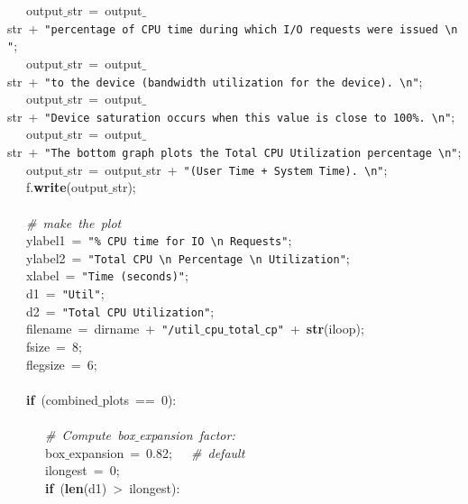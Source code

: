 \mbox{}\ \ \ output$\_$str\ =\ output$\_$str\ +\ \texttt{"{}percentage\ of\ CPU\ time\ during\ which\ I/O\ requests\ were\ issued\ \textbackslash{}n"{}}; \\
\mbox{}\ \ \ output$\_$str\ =\ output$\_$str\ +\ \texttt{"{}to\ the\ device\ (bandwidth\ utilization\ for\ the\ device).\ \textbackslash{}n"{}}; \\
\mbox{}\ \ \ output$\_$str\ =\ output$\_$str\ +\ \texttt{"{}Device\ saturation\ occurs\ when\ this\ value\ is\ close\ to\ 100\%.\ \textbackslash{}n"{}}; \\
\mbox{}\ \ \ output$\_$str\ =\ output$\_$str\ +\ \texttt{"{}The\ bottom\ graph\ plots\ the\ Total\ CPU\ Utilization\ percentage\ \textbackslash{}n"{}}; \\
\mbox{}\ \ \ output$\_$str\ =\ output$\_$str\ +\ \texttt{"{}(User\ Time\ +\ System\ Time).\ \textbackslash{}n"{}}; \\
\mbox{}\ \ \ f.\textbf{write}(output$\_$str); \\
\mbox{}\ \ \  \\
\mbox{}\ \ \ \textit{\#\ make\ the\ plot} \\
\mbox{}\ \ \ ylabel1\ =\ \texttt{"{}\%\ CPU\ time\ for\ IO\ \textbackslash{}n\ Requests"{}}; \\
\mbox{}\ \ \ ylabel2\ =\ \texttt{"{}Total\ CPU\ \textbackslash{}n\ Percentage\ \textbackslash{}n\ Utilization"{}}; \\
\mbox{}\ \ \ xlabel\ =\ \texttt{"{}Time\ (seconds)"{}}; \\
\mbox{}\ \ \ d1\ =\ \texttt{"{}Util"{}}; \\
\mbox{}\ \ \ d2\ =\ \texttt{"{}Total\ CPU\ Utilization"{}}; \\
\mbox{}\ \ \ filename\ =\ dirname\ +\ \texttt{"{}/util$\_$cpu$\_$total$\_$cp"{}}\ +\ \textbf{str}(iloop); \\
\mbox{}\ \ \ fsize\ =\ 8; \\
\mbox{}\ \ \ flegsize\ =\ 6; \\
\mbox{}\ \ \  \\
\mbox{}\ \ \ \textbf{if}\ (combined$\_$plots\ ==\ 0): \\
\mbox{}\ \ \ \ \ \  \\
\mbox{}\ \ \ \ \ \ \textit{\#\ Compute\ box$\_$expansion\ factor:} \\
\mbox{}\ \ \ \ \ \ box$\_$expansion\ =\ 0.82;\ \ \ \textit{\#\ default} \\
\mbox{}\ \ \ \ \ \ ilongest\ =\ 0; \\
\mbox{}\ \ \ \ \ \ \textbf{if}\ (\textbf{len}(d1)\ \textgreater{}\ ilongest): \\
